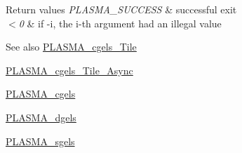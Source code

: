 \begin{DoxyRetVals}{Return values}
{\em P\+L\+A\+S\+M\+A\+\_\+\+S\+U\+C\+C\+E\+S\+S} & successful exit \\
\hline
{\em $<$0} & if -\/i, the i-\/th argument had an illegal value\\
\hline
\end{DoxyRetVals}
\begin{DoxySeeAlso}{See also}
\hyperlink{group__PLASMA__Complex32__t__Tile_gaa50da512c98d8fc5a0600577ff930a7d_gaa50da512c98d8fc5a0600577ff930a7d}{P\+L\+A\+S\+M\+A\+\_\+cgels\+\_\+\+Tile} 

\hyperlink{group__PLASMA__Complex32__t__Tile__Async_ga7a7704d98d5c0dbebe99aecdad6f9106_ga7a7704d98d5c0dbebe99aecdad6f9106}{P\+L\+A\+S\+M\+A\+\_\+cgels\+\_\+\+Tile\+\_\+\+Async} 

\hyperlink{group__PLASMA__Complex32__t_ga047c51e0c630ac15b2679b8352013f7b_ga047c51e0c630ac15b2679b8352013f7b}{P\+L\+A\+S\+M\+A\+\_\+cgels} 

\hyperlink{group__double_ga4bfc0cdaf567c26828f484e54d457d92_ga4bfc0cdaf567c26828f484e54d457d92}{P\+L\+A\+S\+M\+A\+\_\+dgels} 

\hyperlink{group__float_ga2bbab59e86acca698a73c5bc8023e5c3_ga2bbab59e86acca698a73c5bc8023e5c3}{P\+L\+A\+S\+M\+A\+\_\+sgels} 
\end{DoxySeeAlso}
\hypertarget{group__PLASMA__Complex32__t_ga5505cdf8794ea00c9160d656d2a00ec9_ga5505cdf8794ea00c9160d656d2a00ec9}{}
